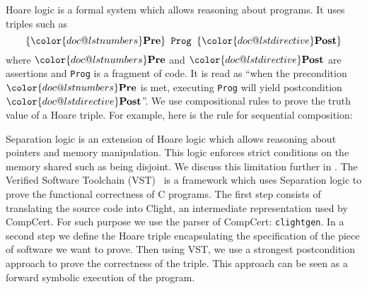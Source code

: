 Hoare logic is a formal system which allows reasoning about programs.
It uses triples such as
$$\{{\color{doc@lstnumbers}\textbf{Pre}}\}\texttt{~Prog~}\{{\color{doc@lstdirective}\textbf{Post}}\}$$
where ${\color{doc@lstnumbers}\textbf{Pre}}$ and ${\color{doc@lstdirective}\textbf{Post}}$
are assertions and \texttt{Prog} is a fragment of code.
It is read as
``when the precondition  ${\color{doc@lstnumbers}\textbf{Pre}}$ is met,
executing \texttt{Prog} will yield postcondition ${\color{doc@lstdirective}\textbf{Post}}$''.
We use compositional rules to prove the truth value of a Hoare triple.
For example, here is the rule for sequential composition:
\begin{prooftree}
\end{prooftree}
Separation logic is an extension of Hoare logic which allows reasoning about
pointers and memory manipulation. This logic enforces strict conditions on the
memory shared such as being disjoint.
We discuss this limitation further in .
The Verified Software Toolchain (VST)~\cite{cao2018vst-floyd} is a framework
which uses Separation logic to prove the functional correctness of C programs.
The first step consists of translating the source code into Clight,
an intermediate representation used by CompCert.
For such purpose we use the parser of CompCert: \texttt{clightgen}.
In a second step we define the Hoare triple encapsulating the specification of the
piece of software we want to prove. Then using VST, we  use a strongest
postcondition approach to prove the correctness of the triple.
This approach can be seen as a forward symbolic execution of the program.
